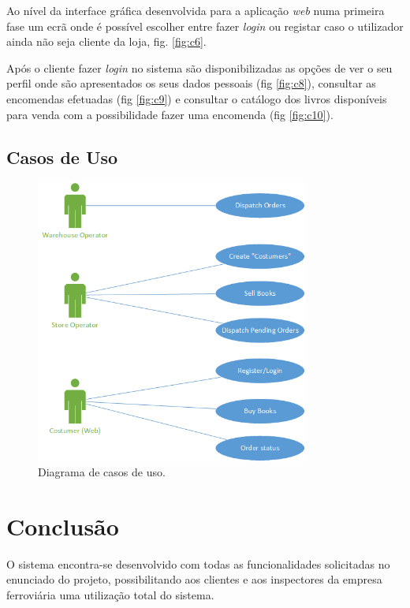 \documentclass[12pt]{article}
\begin{document}
Ao nível da interface gráfica desenvolvida para a aplicação \textit{web} numa primeira fase um ecrã onde é possível escolher entre fazer \textit{login} ou registar caso o utilizador ainda não seja cliente da loja, fig. \ref{fig:c6}.

Após o cliente fazer \textit{login} no sistema são disponibilizadas as opções de ver o seu perfil onde são apresentados os seus dados pessoais (fig \ref{fig:c8}), consultar as encomendas efetuadas (fig \ref{fig:c9}) e consultar o catálogo dos livros disponíveis para venda com a possibilidade fazer uma encomenda (fig \ref{fig:c10}).

\subsection{Casos de Uso}
\begin{figure}[H]
    \centering
    \includegraphics[width=0.8\textwidth]{use.png}
    \caption{Diagrama de casos de uso.}
    \label{fig:use}
\end{figure}


\section{Conclusão}

O sistema encontra-se desenvolvido com todas as funcionalidades solicitadas no enunciado do projeto, possibilitando aos clientes e aos inspectores da empresa ferroviária uma utilização total do sistema.
\end{document}
